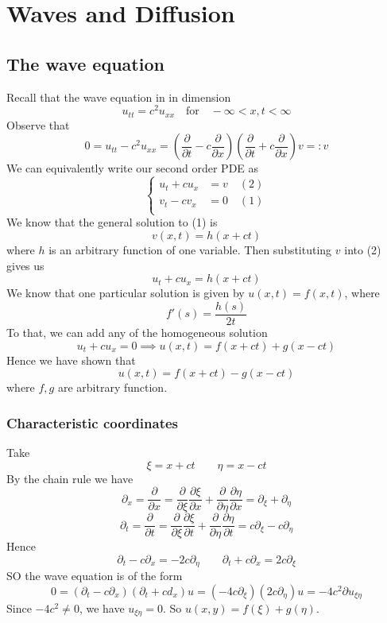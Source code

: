\section{Waves and Diffusion}
\subsection{The wave equation}
Recall that the wave equation in in dimension
\[ u_{tt} = c^2 u_{xx} \quad \mathrm{for} \quad -\infty < x,t < \infty\]
Observe that
\[ 0 = u_{tt} - c^2 u_{xx} = \left( \frac{\partial }{\partial t} - c \frac{\partial }{\partial x} \right) \left( \frac{\partial }{\partial t} + c \frac{\partial }{\partial x} \right)v  =: v \]
We can equivalently write our second order PDE as 
\[\left\{ \begin{array}{rl} 
	u_{t} + c u_{x} &= v \quad (2) \\
	v_t - c v_x &= 0 \quad (1) \\
\end{array} \right. \]
We know that the general solution to (1) is
\[ v(x,t) = h(x + ct)\]
where $h$ is an arbitrary function of one variable. Then substituting $v$ into (2) gives us
\[ u_t + cu_x = h(x + ct)\]
We know that one particular solution is given by $u(x,t) = f(x,t)$, where 
\[ f'(s) = \frac{h(s)}{2t}\]
To that, we can add any of the homogeneous solution
\[ u_t + c u_x = 0 \implies u(x,t) = f(x + ct) + g(x - ct)\]
Hence we have shown that 
\[ u(x,t) = f(x + ct)  - g(x - ct)\]
where $f,g$ are arbitrary function.
\subsubsection{Characteristic coordinates}
Take
\[ \xi = x + ct \qquad \eta = x - ct\]
By the chain rule we have
\[ \partial_x = \frac{\partial}{\partial x} = \frac{\partial }{\partial \xi} \frac{\partial \xi}{\partial x} + \frac{\partial }{\partial \eta} \frac{\partial \eta}{\partial x} = \partial_\xi + \partial_\eta\]
\[ \partial_t = \frac{\partial}{\partial t} = \frac{\partial }{\partial \xi} \frac{\partial \xi}{\partial t} + \frac{\partial }{\partial \eta} \frac{\partial \eta}{\partial t} = c\partial_\xi - c\partial_\eta \]
Hence
\[ \partial_t - c \partial_x = -2c \partial_\eta \qquad \partial_t + c \partial_x = 2c \partial_\xi\]
SO the wave equation is of the form
\[ 0 = (\partial _t - c\partial_x)(\partial_t + cd_x)u = (-4c \partial_\xi)(2c\partial_\eta)u = -4c^2\partial u_{\xi \eta}\]
Since $-4c^2 \neq 0$, we have $u_{\xi \eta} = 0$.
So $u(x,y) = f(\xi) + g(\eta)$.
